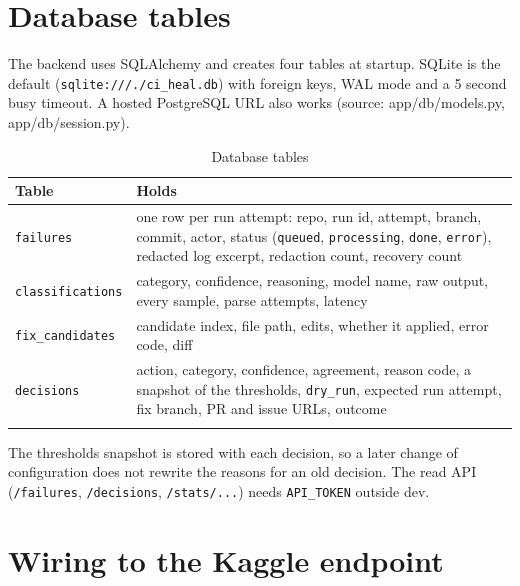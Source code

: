 \section{Database tables}

The backend uses SQLAlchemy and creates four tables at startup. SQLite is the default (\texttt{sqlite:\allowbreak{}/\allowbreak{}/\allowbreak{}/\allowbreak{}.\allowbreak{}/\allowbreak{}ci\_\allowbreak{}heal.\allowbreak{}db}) with foreign keys, WAL mode and a 5 second busy timeout. A hosted PostgreSQL URL also works (source: app/\allowbreak{}db/\allowbreak{}models.py, app/\allowbreak{}db/\allowbreak{}session.py).

\begingroup\small
\begin{longtable}{>{\raggedright\arraybackslash}p{0.392\dimexpr\linewidth-4\tabcolsep\relax}>{\raggedright\arraybackslash}p{0.608\dimexpr\linewidth-4\tabcolsep\relax}}
\toprule
\rowcolor{gray!14}\textbf{Table} & \textbf{Holds} \\
\midrule
\endhead
\bottomrule
\endfoot
\endlastfoot
\texttt{failures} & one row per run attempt: repo, run id, attempt, branch, commit, actor, status (\texttt{queued}, \texttt{processing}, \texttt{done}, \texttt{error}), redacted log excerpt, redaction count, recovery count \\
\texttt{classifications} & category, confidence, reasoning, model name, raw output, every sample, parse attempts, latency \\
\texttt{fix\_\allowbreak{}candidates} & candidate index, file path, edits, whether it applied, error code, diff \\
\texttt{decisions} & action, category, confidence, agreement, reason code, a snapshot of the thresholds, \texttt{dry\_\allowbreak{}run}, expected run attempt, fix branch, PR and issue URLs, outcome \\
\bottomrule
\caption{Database tables}\label{tab:08-3}\\
\end{longtable}
\endgroup

The thresholds snapshot is stored with each decision, so a later change of configuration does not rewrite the reasons for an old decision. The read API (\texttt{/\allowbreak{}failures}, \texttt{/\allowbreak{}decisions}, \texttt{/\allowbreak{}stats/\allowbreak{}.\allowbreak{}.\allowbreak{}.\allowbreak{}}) needs \texttt{API\_\allowbreak{}TOKEN} outside dev.

\section{Wiring to the Kaggle endpoint}


